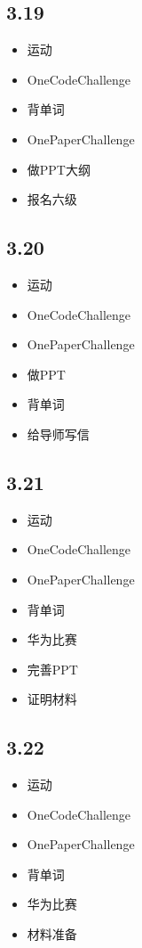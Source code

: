 \documentclass[UTF8]{ctexart}
\begin{document}
\subsection*{3.19}
\begin{itemize}
    \item 运动
    \item OneCodeChallenge
    \item 背单词
    \item OnePaperChallenge
    \item 做PPT大纲
    \item 报名六级
\end{itemize}

\subsection*{3.20}
\begin{itemize}
    \item 运动
    \item OneCodeChallenge
    \item OnePaperChallenge
    \item 做PPT
    \item 背单词
    \item 给导师写信
\end{itemize}

\subsection*{3.21}
\begin{itemize}
    \item 运动
    \item OneCodeChallenge
    \item OnePaperChallenge
    \item 背单词
    \item 华为比赛
    \item 完善PPT
    \item 证明材料
\end{itemize}

\subsection*{3.22}
\begin{itemize}
    \item 运动
    \item OneCodeChallenge
    \item OnePaperChallenge
    \item 背单词
    \item 华为比赛
    \item 材料准备
\end{itemize}
\end{document}
